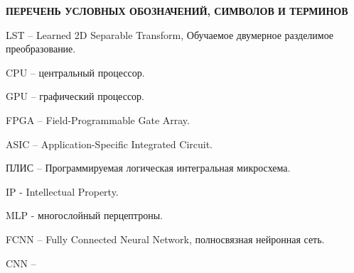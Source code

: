\begin{center}
  \textbf{ПЕРЕЧЕНЬ УСЛОВНЫХ ОБОЗНАЧЕНИЙ, СИМВОЛОВ И ТЕРМИНОВ}
\end{center}

LST – Learned 2D Separable Transform, Обучаемое двумерное разделимое преобразование.

CPU – центральный процессор.

GPU – графический процессор.

FPGA – Field-Programmable Gate Array.

ASIC – Application-Specific Integrated Circuit.

ПЛИС – Программируемая логическая интегральная микросхема.

IP - Intellectual Property.

MLP - многослойный перцептроны.

FCNN – Fully Connected Neural Network, полносвязная нейронная сеть.

CNN –